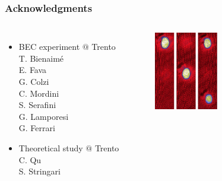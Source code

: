 \begin{frame}
\frametitle{Acknowledgments}

\begin{columns}[b]



\begin{itemize}
\item BEC \textcolor{bellblue}{experiment} $@$ Trento\\
\vspace{0.5em}
T. Bienaimé\\
E. Fava\\
G. Colzi\\
C. Mordini\\
S. Serafini\\
G. Lamporesi\\
G. Ferrari\\

\item \textcolor{bellblue}{Theoretical} study $@$ Trento\\
\vspace{0.5em}
C. Qu \\
S. Stringari

\vspace{1em}

\end{itemize}


\begin{figure}
\centering
\includegraphics[width=0.55\textwidth]{Figures/TitlePicture.pdf}
\end{figure}

\end{columns}


\end{frame}
